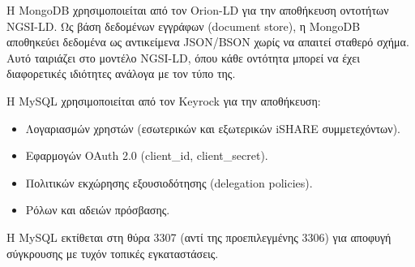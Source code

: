 Η \textlatin{MongoDB} χρησιμοποιείται από τον
\textlatin{Orion-LD} για την αποθήκευση οντοτήτων \textlatin{NGSI-LD}.
Ως βάση δεδομένων εγγράφων (\textlatin{document store}), η
\textlatin{MongoDB} αποθηκεύει δεδομένα ως αντικείμενα
\textlatin{JSON}/\textlatin{BSON} χωρίς να απαιτεί σταθερό σχήμα.
Αυτό ταιριάζει στο μοντέλο \textlatin{NGSI-LD}, όπου κάθε
οντότητα μπορεί να έχει διαφορετικές ιδιότητες ανάλογα με τον
τύπο της.

Η \textlatin{MySQL} χρησιμοποιείται από τον
\textlatin{Keyrock} για την αποθήκευση:
\begin{itemize}
    \item Λογαριασμών χρηστών (εσωτερικών και εξωτερικών
    \textlatin{iSHARE} συμμετεχόντων).
    \item Εφαρμογών \textlatin{OAuth 2.0} (\textlatin{client\_id},
    \textlatin{client\_secret}).
    \item Πολιτικών εκχώρησης εξουσιοδότησης
    (\textlatin{delegation policies}).
    \item Ρόλων και αδειών πρόσβασης.
\end{itemize}

Η \textlatin{MySQL} εκτίθεται στη θύρα \textlatin{3307} (αντί της
προεπιλεγμένης \textlatin{3306}) για αποφυγή σύγκρουσης με τυχόν
τοπικές εγκαταστάσεις.

